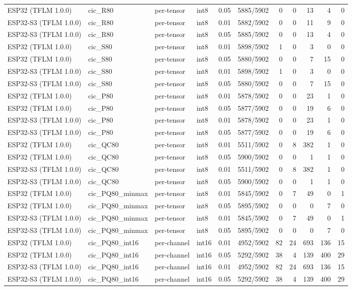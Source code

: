 \documentclass[10pt]{article}
\begin{document}
{\begin{longtable}{lllllrrrrrr}
ESP32 (TFLM 1.0.0) & cic\_R80 & per-tensor & int8 & 0.05 & 5885/5902 & 0 & 0 & 13 & 4 & 0 \\
ESP32-S3 (TFLM 1.0.0) & cic\_R80 & per-tensor & int8 & 0.01 & 5882/5902 & 0 & 0 & 11 & 9 & 0 \\
ESP32-S3 (TFLM 1.0.0) & cic\_R80 & per-tensor & int8 & 0.05 & 5885/5902 & 0 & 0 & 13 & 4 & 0 \\
ESP32 (TFLM 1.0.0) & cic\_S80 & per-tensor & int8 & 0.01 & 5898/5902 & 1 & 0 & 3 & 0 & 0 \\
ESP32 (TFLM 1.0.0) & cic\_S80 & per-tensor & int8 & 0.05 & 5880/5902 & 0 & 0 & 7 & 15 & 0 \\
ESP32-S3 (TFLM 1.0.0) & cic\_S80 & per-tensor & int8 & 0.01 & 5898/5902 & 1 & 0 & 3 & 0 & 0 \\
ESP32-S3 (TFLM 1.0.0) & cic\_S80 & per-tensor & int8 & 0.05 & 5880/5902 & 0 & 0 & 7 & 15 & 0 \\
ESP32 (TFLM 1.0.0) & cic\_P80 & per-tensor & int8 & 0.01 & 5878/5902 & 0 & 0 & 23 & 1 & 0 \\
ESP32 (TFLM 1.0.0) & cic\_P80 & per-tensor & int8 & 0.05 & 5877/5902 & 0 & 0 & 19 & 6 & 0 \\
ESP32-S3 (TFLM 1.0.0) & cic\_P80 & per-tensor & int8 & 0.01 & 5878/5902 & 0 & 0 & 23 & 1 & 0 \\
ESP32-S3 (TFLM 1.0.0) & cic\_P80 & per-tensor & int8 & 0.05 & 5877/5902 & 0 & 0 & 19 & 6 & 0 \\
ESP32 (TFLM 1.0.0) & cic\_QC80 & per-tensor & int8 & 0.01 & 5511/5902 & 0 & 8 & 382 & 1 & 0 \\
ESP32 (TFLM 1.0.0) & cic\_QC80 & per-tensor & int8 & 0.05 & 5900/5902 & 0 & 0 & 1 & 1 & 0 \\
ESP32-S3 (TFLM 1.0.0) & cic\_QC80 & per-tensor & int8 & 0.01 & 5511/5902 & 0 & 8 & 382 & 1 & 0 \\
ESP32-S3 (TFLM 1.0.0) & cic\_QC80 & per-tensor & int8 & 0.05 & 5900/5902 & 0 & 0 & 1 & 1 & 0 \\
ESP32 (TFLM 1.0.0) & cic\_PQ80\_minmax & per-tensor & int8 & 0.01 & 5845/5902 & 0 & 7 & 49 & 0 & 1 \\
ESP32 (TFLM 1.0.0) & cic\_PQ80\_minmax & per-tensor & int8 & 0.05 & 5895/5902 & 0 & 0 & 0 & 7 & 0 \\
ESP32-S3 (TFLM 1.0.0) & cic\_PQ80\_minmax & per-tensor & int8 & 0.01 & 5845/5902 & 0 & 7 & 49 & 0 & 1 \\
ESP32-S3 (TFLM 1.0.0) & cic\_PQ80\_minmax & per-tensor & int8 & 0.05 & 5895/5902 & 0 & 0 & 0 & 7 & 0 \\
ESP32 (TFLM 1.0.0) & cic\_PQ80\_int16 & per-channel & int16 & 0.01 & 4952/5902 & 82 & 24 & 693 & 136 & 15 \\
ESP32 (TFLM 1.0.0) & cic\_PQ80\_int16 & per-channel & int16 & 0.05 & 5292/5902 & 38 & 4 & 139 & 400 & 29 \\
ESP32-S3 (TFLM 1.0.0) & cic\_PQ80\_int16 & per-channel & int16 & 0.01 & 4952/5902 & 82 & 24 & 693 & 136 & 15 \\
ESP32-S3 (TFLM 1.0.0) & cic\_PQ80\_int16 & per-channel & int16 & 0.05 & 5292/5902 & 38 & 4 & 139 & 400 & 29 \\
\end{longtable}}
\end{document}
